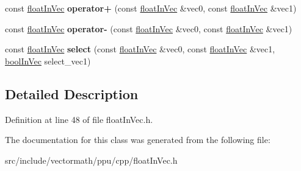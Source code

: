 \begin{DoxyCompactItemize}
\item 
\hypertarget{classVectormath_1_1floatInVec_a9e67ab843002e647fa7bb2caed760bdc}{const \hyperlink{classVectormath_1_1floatInVec}{float\-In\-Vec} {\bfseries operator+} (const \hyperlink{classVectormath_1_1floatInVec}{float\-In\-Vec} \&vec0, const \hyperlink{classVectormath_1_1floatInVec}{float\-In\-Vec} \&vec1)}\label{classVectormath_1_1floatInVec_a9e67ab843002e647fa7bb2caed760bdc}

\item 
\hypertarget{classVectormath_1_1floatInVec_ac6c858483e69952c29682d153854fbe2}{const \hyperlink{classVectormath_1_1floatInVec}{float\-In\-Vec} {\bfseries operator-\/} (const \hyperlink{classVectormath_1_1floatInVec}{float\-In\-Vec} \&vec0, const \hyperlink{classVectormath_1_1floatInVec}{float\-In\-Vec} \&vec1)}\label{classVectormath_1_1floatInVec_ac6c858483e69952c29682d153854fbe2}

\item 
\hypertarget{classVectormath_1_1floatInVec_a2970b847bee6dc51a58e7b308ab866c0}{const \hyperlink{classVectormath_1_1floatInVec}{float\-In\-Vec} {\bfseries select} (const \hyperlink{classVectormath_1_1floatInVec}{float\-In\-Vec} \&vec0, const \hyperlink{classVectormath_1_1floatInVec}{float\-In\-Vec} \&vec1, \hyperlink{classVectormath_1_1boolInVec}{bool\-In\-Vec} select\-\_\-vec1)}\label{classVectormath_1_1floatInVec_a2970b847bee6dc51a58e7b308ab866c0}

\end{DoxyCompactItemize}


\subsection{Detailed Description}


Definition at line 48 of file float\-In\-Vec.\-h.



The documentation for this class was generated from the following file\-:\begin{DoxyCompactItemize}
\item 
src/include/vectormath/ppu/cpp/float\-In\-Vec.\-h\end{DoxyCompactItemize}
